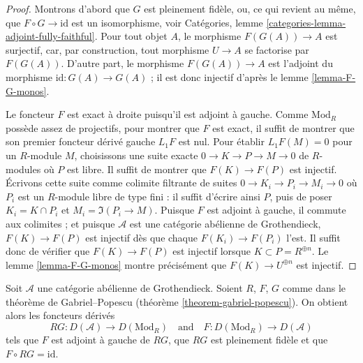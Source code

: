 \begin{proof}
Montrons d'abord que $G$ est pleinement fidèle, ou, ce qui revient au même,
que $F \circ G \to \text{id}$ est un isomorphisme, voir Catégories, lemme
\ref{categories-lemma-adjoint-fully-faithful}. Pour tout objet $A$, le
morphisme $F(G(A)) \to A$ est surjectif, car, par construction, tout morphisme
$U \to A$ se factorise par $F(G(A))$. D'autre part, le morphisme
$F(G(A)) \to A$ est l'adjoint du morphisme
$\text{id} : G(A) \to G(A)$ ; il est donc injectif d'après le lemme
\ref{lemma-F-G-monos}.

\medskip\noindent
Le foncteur $F$ est exact à droite puisqu'il est adjoint à gauche.
Comme $\text{Mod}_R$ possède assez de projectifs, pour montrer que $F$ est
exact, il suffit de montrer que son premier foncteur dérivé gauche $L_1F$ est
nul. Pour établir $L_1F(M) = 0$ pour un $R$-module $M$, choisissons une suite
exacte $0 \to K \to P \to M \to 0$ de $R$-modules où $P$ est libre. Il suffit
de montrer que $F(K) \to F(P)$ est injectif. Écrivons cette suite comme
colimite filtrante de suites $0 \to K_i \to P_i \to M_i \to 0$ où $P_i$ est
un $R$-module libre de type fini : il suffit d'écrire ainsi $P$, puis de poser
$K_i = K \cap P_i$ et $M_i = \Im(P_i \to M)$. Puisque $F$ est adjoint à
gauche, il commute aux colimites ; et puisque $\mathcal{A}$ est une catégorie
abélienne de Grothendieck, $F(K) \to F(P)$ est injectif dès que chaque
$F(K_i) \to F(P_i)$ l'est. Il suffit donc de vérifier que
$F(K) \to F(P)$ est injectif lorsque $K \subset P = R^{\oplus n}$.
Le lemme \ref{lemma-F-G-monos} montre précisément que
$F(K) \to U^{\oplus n}$ est injectif.
\end{proof}

\begin{lemma}
\label{lemma-gabriel-popescu}
\begin{reference}
\cite[Corollary 4.1]{serpe}
\end{reference}
Soit $\mathcal{A}$ une catégorie abélienne de Grothendieck. Soient
$R$, $F$, $G$ comme dans le théorème de Gabriel--Popescu
(théorème \ref{theorem-gabriel-popescu}). On obtient alors les foncteurs
dérivés
$$
RG : D(\mathcal{A}) \to D(\text{Mod}_R)
\quad\text{and}\quad
F : D(\text{Mod}_R) \to D(\mathcal{A})
$$
tels que $F$ est adjoint à gauche de $RG$, que $RG$ est pleinement fidèle et
que $F \circ RG = \text{id}$.
\end{lemma}

